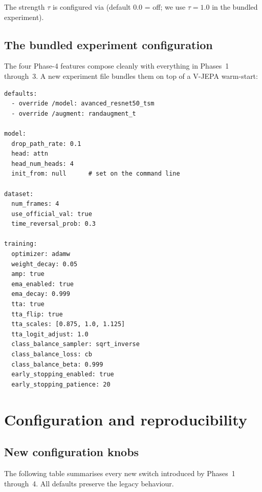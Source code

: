 The strength \(\tau\) is configured via
 (default \(0.0\) = off; we use
\(\tau = 1.0\) in the bundled experiment).

\subsection{The bundled experiment configuration}

The four Phase-4 features compose cleanly with everything in Phases~1
through~3. A new experiment file
 bundles them on
top of a V-JEPA warm-start:

\begin{lstlisting}[style=yaml]
defaults:
  - override /model: avanced_resnet50_tsm
  - override /augment: randaugment_t

model:
  drop_path_rate: 0.1
  head: attn
  head_num_heads: 4
  init_from: null      # set on the command line

dataset:
  num_frames: 4
  use_official_val: true
  time_reversal_prob: 0.3

training:
  optimizer: adamw
  weight_decay: 0.05
  amp: true
  ema_enabled: true
  ema_decay: 0.999
  tta: true
  tta_flip: true
  tta_scales: [0.875, 1.0, 1.125]
  tta_logit_adjust: 1.0
  class_balance_sampler: sqrt_inverse
  class_balance_loss: cb
  class_balance_beta: 0.999
  early_stopping_enabled: true
  early_stopping_patience: 20
\end{lstlisting}

\section{Configuration and reproducibility}
\label{sec:configs}

\subsection{New configuration knobs}

The following table summarises every new switch introduced by Phases~1
through~4. All defaults preserve the legacy behaviour.

